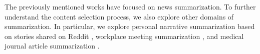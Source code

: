 


The previously mentioned works have
focused on news summarization. To further
understand the content selection process, we also explore other domains 
of summarization. In particular, we explore 
personal narrative summarization based on stories shared
on Reddit \cite{ouyang2017crowd}, workplace meeting summarization
\cite{carletta2005ami}, and medical journal article summarization 
\cite{mishra2014text}. 

